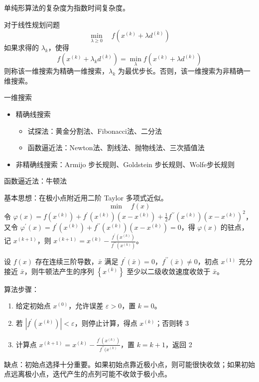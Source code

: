 \begin{remark}
    单纯形算法的复杂度为指数时间复杂度。
\end{remark}

\begin{remark}
    对于线性规划问题 \[\min_{\lambda \ge 0} \quad f(x^{(k)} + \lambda d^{(k)})\] 如果求得的 $\lambda_k$，使得 \[f(x^{(k)} + \lambda_kd^{(k)}) = \min_\lambda f(x^{(k)} + \lambda d^{(k)})\]则称该一维搜索为精确一维搜索，$\lambda_k$ 为最优步长。否则，该一维搜索为非精确一维搜索。
\end{remark}

\begin{remark}
    一维搜索\begin{itemize}
        \item 精确线搜索\begin{itemize}
            \item 试探法：黄金分割法、Fibonacci法、二分法
            \item 函数逼近法：Newton法、割线法、抛物线法、三次插值法
        \end{itemize}
        \item 非精确线搜索：Armijo 步长规则、Goldstein 步长规则、Wolfe步长规则
    \end{itemize}
\end{remark}

\begin{remark}
    函数逼近法：牛顿法

    基本思想：在极小点附近用二阶 Taylor 多项式近似。 \[\min \quad f(x)\]
    令 $\varphi(x)=f\left(x^{(k)}\right)+f^{\prime}\left(x^{(k)}\right)\left(x-x^{(k)}\right)+\frac{1}{2} f^{\prime \prime}\left(x^{(k)}\right)\left(x-x^{(k)}\right)^{2}$，又令 $\varphi^{\prime}(x)=f^{\prime}\left(x^{(k)}\right)+f^{\prime \prime}\left(x^{(k)}\right)\left(x-x^{(k)}\right)=0$，得 $\varphi(x)$ 的驻点，记 $x^{(k + 1)}$，则 $x^{(k+1)}=x^{(k)}-\frac{f^{\prime}\left(x^{(k)}\right)}{f^{\prime \prime}\left(x^{(k)}\right)}$。

    \begin{theorem}
        设 $f(x)$ 存在连续三阶导数，$\bar{x}$ 满足 $f^\prime(\bar{x}) = 0$，$f^{\prime\prime}(\bar{x}) \neq 0$，初点 $x^{(1)}$ 充分接近 $\bar{x}$，则牛顿法产生的序列 $\left\{x^{(k)}\right\}$ 至少以二级收敛速度收敛于 $\bar{x}$。
    \end{theorem}

    算法步骤：\begin{enumerate}
        \item 给定初始点 $x^{(0)}$，允许误差 $\varepsilon > 0$，置 $k = 0$。
        \item 若 $|f^\prime(x^{(k)})| < \varepsilon$，则停止计算，得点 $x^{(k)}$；否则转 3
        \item 计算点 $x^{(k + 1)} = x^{(k)} - \frac{f^\prime(x^{(k)})}{f^{\prime\prime}(x^{(k)}}$，置 $k = k + 1$，返回 2
    \end{enumerate}

    缺点：初始点选择十分重要。如果初始点靠近极小点，则可能很快收敛；如果初始点远离极小点，迭代产生的点列可能不收敛于极小点。
\end{remark}

